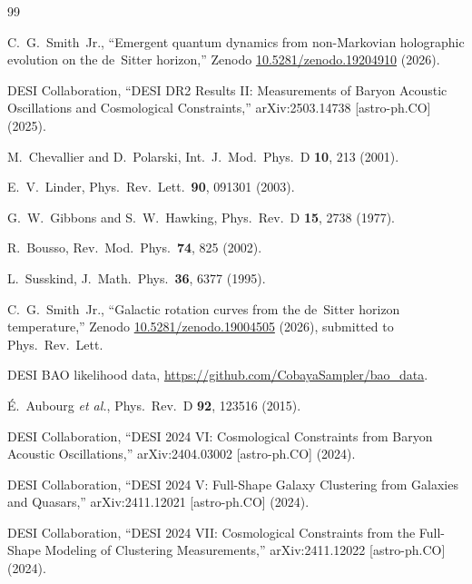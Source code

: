 \documentclass[aps,prl,twocolumn,showpacs,preprintnumbers,amsmath,amssymb,superscriptaddress]{revtex4-2}
\begin{document}
\begin{thebibliography}{99}

C.~G.~Smith~Jr.,
``Emergent quantum dynamics from non-Markovian holographic evolution 
on the de~Sitter horizon,''
Zenodo \href{https://doi.org/10.5281/zenodo.19204910}{10.5281/zenodo.19204910} (2026).

DESI Collaboration,
``DESI DR2 Results II: Measurements of Baryon Acoustic Oscillations and 
Cosmological Constraints,''
arXiv:2503.14738 [astro-ph.CO] (2025).

M.~Chevallier and D.~Polarski,
Int.\ J.\ Mod.\ Phys.\ D \textbf{10}, 213 (2001).

E.~V.~Linder,
Phys.\ Rev.\ Lett.\ \textbf{90}, 091301 (2003).

G.~W.~Gibbons and S.~W.~Hawking,
Phys.\ Rev.\ D \textbf{15}, 2738 (1977).

R.~Bousso,
Rev.\ Mod.\ Phys.\ \textbf{74}, 825 (2002).

L.~Susskind,
J.\ Math.\ Phys.\ \textbf{36}, 6377 (1995).

C.~G.~Smith~Jr.,
``Galactic rotation curves from the de~Sitter horizon temperature,''
Zenodo \href{https://doi.org/10.5281/zenodo.19004505}{10.5281/zenodo.19004505} (2026),
submitted to Phys.\ Rev.\ Lett.

DESI BAO likelihood data,
\url{https://github.com/CobayaSampler/bao_data}.

\'E.~Aubourg \textit{et al.},
Phys.\ Rev.\ D \textbf{92}, 123516 (2015).

DESI Collaboration,
``DESI 2024 VI: Cosmological Constraints from Baryon Acoustic 
Oscillations,''
arXiv:2404.03002 [astro-ph.CO] (2024).

DESI Collaboration,
``DESI 2024 V: Full-Shape Galaxy Clustering from Galaxies and 
Quasars,''
arXiv:2411.12021 [astro-ph.CO] (2024).

DESI Collaboration,
``DESI 2024 VII: Cosmological Constraints from the Full-Shape 
Modeling of Clustering Measurements,''
arXiv:2411.12022 [astro-ph.CO] (2024).

\end{thebibliography}
\end{document}
